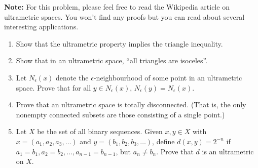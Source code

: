 \documentclass[letterpaper,12pt]{article}
\begin{document}
\begin{enumerate}
{\bf Note:} For this problem, please feel free to read the Wikipedia article on ultrametric spaces. You won't find any proofs but you can read about several interesting applications.
\begin{enumerate}
\item Show that the ultrametric property implies the triangle inequality.
\item Show that in an ultrametric space, ``all triangles are isoceles''.
\item Let $N_\epsilon(x)$ denote the $\epsilon$-neighbourhood of some point in an ultrametric space. Prove that for all $y\in N_\epsilon(x)$, $N_\epsilon(y) = N_\epsilon(x)$.
\item Prove that an ultrametric space is totally disconnected. (That is, the only nonempty connected subsets are those consisting of a single point.)
\item Let $X$ be the set of all binary sequences. Given $x,y\in X$ with $x=(a_1,a_2,a_3,\ldots)$ and $y=(b_1,b_2,b_3,\ldots)$, define $d(x,y) = 2^{-n}$ if $a_1=b_1, a_2=b_2,\ldots, a_{n-1}=b_{n-1}$, but $a_n\neq b_n$. Prove that $d$ is an ultrametric on $X$.
\end{enumerate}


\end{enumerate}
\end{document}
